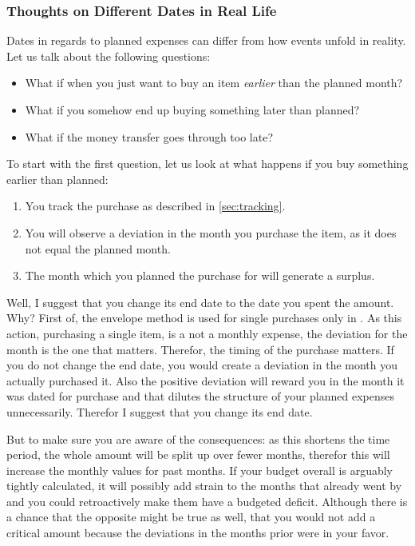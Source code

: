 \subsubsection{Thoughts on Different Dates in Real Life}
\label{subsubsec:thoughts-different-dates}

Dates in regards to planned expenses can differ from how events unfold in reality.
Let us talk about the following questions:
\begin{itemize}
	\item What if when you just want to buy an item \emph{earlier} than the planned month?
	\item What if you somehow end up buying something later than planned?
	\item What if the money transfer goes through too late?
\end{itemize}

To start with the first question, let us look at what happens if you buy something earlier than planned:
\begin{enumerate}
	\item You track the purchase as described in \autoref{sec:tracking}.
	\item You will observe a deviation in the month you purchase the item, as it does not equal the planned month.
	\item The month which you planned the purchase for will generate a surplus.
\end{enumerate}

Well, I suggest that you change its end date to the date you spent the amount.
Why?
First of, the envelope method is used for single purchases only in \tfn.
As this action, \ie purchasing a single item, is a not a monthly expense, the deviation for the month is the one that matters.
Therefor, the timing of the purchase matters.
If you do not change the end date, you would create a deviation in the month you actually purchased it.
Also the positive deviation will reward you in the month it was dated for purchase and that dilutes the structure of your planned expenses unnecessarily.
Therefor I suggest that you change its end date.

But to make sure you are aware of the consequences: as this shortens the time period, the whole amount will be split up over fewer months, therefor this will increase the monthly values for past months.
If your budget overall is arguably tightly calculated, it will possibly add strain to the months that already went by and you could retroactively make them have a budgeted deficit.
Although there is a chance that the opposite might be true as well, that you would not add a critical amount because the deviations in the months prior were in your favor.

